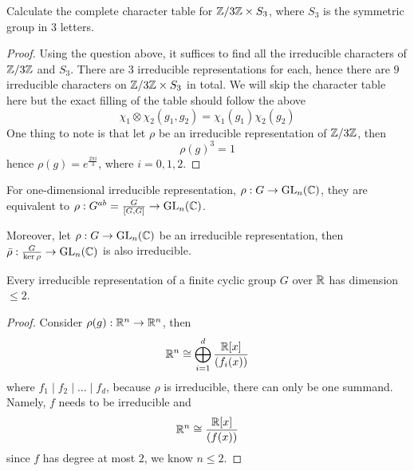 \begin{prob}[S2001-Q3]
    Calculate the complete character table for $\mathbb{Z}/3\mathbb{Z}\times S_3$, where $S_3$ is the symmetric group in 3 letters.
\end{prob}
\begin{proof}
    Using the question above, it suffices to find all the irreducible characters of $\mathbb{Z}/3\mathbb{Z}$ and $S_3$. There are $3$ irreducible representations for each, hence there are $9$ irreducible characters on $\mathbb{Z}/3\mathbb{Z}\times S_3$ in total. We will skip the character table here but the exact filling of the table should follow the above 
    \begin{equation*}
        \chi_1\otimes\chi_2(g_1,g_2)=\chi_1(g_1)\chi_2(g_2)
    \end{equation*}
    One thing to note is that let $\rho$ be an  irreducible representation of $\mathbb{Z}/3\mathbb{Z}$, then 
    \begin{equation*}
        \rho(g)^3=1
    \end{equation*}
    hence $\rho(g)=e^\frac{2\pi i}{3}$, where $i=0,1,2$.
\end{proof}

\begin{warn}
    For one-dimensional irreducible representation, $\rho: G\to \text{GL}_n(\mathbb{C})$, they are equivalent to $\rho: G^{ab}=\frac{G}{[G,G]}\to\text{GL}_n(\mathbb{C})$.

    Moreover, let $\rho:G\to\text{GL}_n(\mathbb{C})$ be an irreducible  representation, then $\bar{\rho}:\frac{G}{\ker\rho}\to\text{GL}_n(\mathbb{C})$ is also irreducible.
\end{warn}


\begin{prob}
    Every irreducible representation of a finite cyclic group $G$ over $\mathbb{R}$ has dimension $\leq 2$.
\end{prob}
\begin{proof}
    Consider $\rho(g): \mathbb{R}^n\to\mathbb{R}^n$, then 
    \begin{equation*}
        \mathbb{R}^n\cong\bigoplus_{i=1}^d\frac{\mathbb{R}[x]}{(f_i(x))}
    \end{equation*}
    where $f_1\mid f_2\mid\dots\mid f_d$, because $\rho$ is irreducible, there can only be one summand. Namely, $f$ needs to be irreducible and 
    \begin{equation*}
        \mathbb{R}^n\cong\frac{\mathbb{R}[x]}{(f(x))}
    \end{equation*}
    since $f$ has degree at most $2$, we know $n\leq 2$.
\end{proof}

